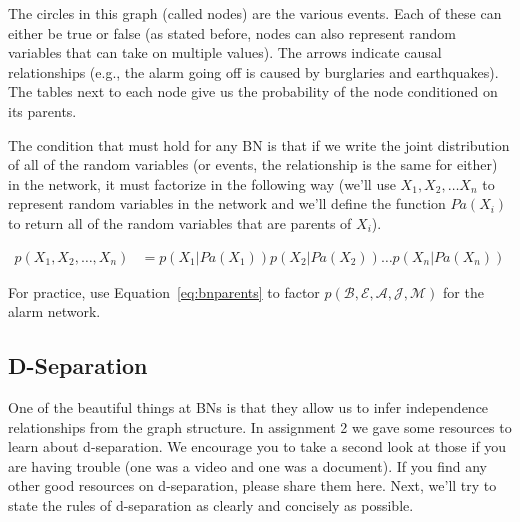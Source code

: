 \documentclass{tufte-handout}
\begin{document}
The circles in this graph (called nodes) are the various events.  Each of these can either be true or false (as stated before, nodes can also represent random variables that can take on multiple values).  The arrows indicate causal relationships (e.g., the alarm going off is caused by burglaries and earthquakes).  The tables next to each node give us the probability of the node conditioned on its parents.

 The condition that must hold for any BN is that if we write the joint distribution of all of the random variables (or events, the relationship is the same for either) in the network, it must factorize in the following way (we'll use $X_1, X_2, \ldots X_n$ to represent random variables in the network and we'll define the function $Pa(X_i)$ to return all of the random variables that are parents of $X_i$).

\begin{align}
p(X_1, X_2, \ldots, X_n) &= p(X_1 | Pa(X_1)) p(X_2 | Pa(X_2)) \ldots p(X_n | Pa(X_n)) \label{eq:bnparents}
\end{align}

\begin{exercise}
For practice, use Equation~\ref{eq:bnparents} to factor $p(\mathcal{B}, \mathcal{E}, \mathcal{A}, \mathcal{J}, \mathcal{M})$ for the alarm network.
\end{exercise}

\subsection{D-Separation}
One of the beautiful things at BNs is that they allow us to infer independence relationships from the graph structure.  In assignment 2 we gave some resources to learn about d-separation.  We encourage you to take a second look at those if you are having trouble (one was a video and one was a document).  If you find any other good resources on d-separation, please share them here.  Next, we'll try to state the rules of d-separation as clearly and concisely as possible.
\end{document}
